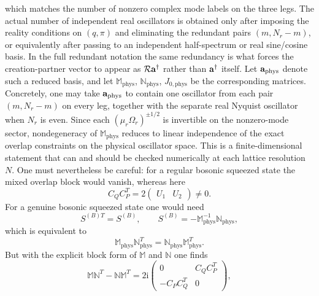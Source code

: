 \documentclass[11pt]{article}
\numberwithin{equation}{section}
\newcommand{\ii}{\mathrm{i}}
\begin{document}
which matches the number of nonzero complex mode labels on the three legs. The actual number of independent real oscillators is obtained only after imposing the reality conditions on $(q,\pi)$ and eliminating the redundant pairs $(m,N_r-m)$, or equivalently after passing to an independent half-spectrum or real sine/cosine basis. In the full redundant notation the same redundancy is what forces the creation-partner vector to appear as $\mathcal R{\bf a}^\dagger$ rather than ${\bf a}^\dagger$ itself. Let ${\bf a}_{\mathrm{phys}}$ denote such a reduced basis, and let $\mathbb M_{\mathrm{phys}}$, $\mathbb N_{\mathrm{phys}}$, $J_{0,\mathrm{phys}}$ be the corresponding matrices. Concretely, one may take ${\bf a}_{\mathrm{phys}}$ to contain one oscillator from each pair $(m,N_r-m)$ on every leg, together with the separate real Nyquist oscillator when $N_r$ is even. Since each $(\mu_r\Omega_r)^{\pm1/2}$ is invertible on the nonzero-mode sector, nondegeneracy of $\mathbb M_{\mathrm{phys}}$ reduces to linear independence of the exact overlap constraints on the physical oscillator space. This is a finite-dimensional statement that can and should be checked numerically at each lattice resolution $N$. One must nevertheless be careful: for a regular bosonic squeezed state the mixed overlap block would vanish, whereas here
\begin{equation}
C_Q C_P^T
=
2\begin{pmatrix}U_1 & U_2\end{pmatrix}\neq 0.
\label{eq:bosonic-symplectic-obstruction}
\end{equation}
For a genuine bosonic squeezed state one would need
\begin{equation}
\label{eq:s11-014}
S^{(B)T}=S^{(B)},
\qquad
S^{(B)}=-\mathbb M_{\mathrm{phys}}^{-1}\mathbb N_{\mathrm{phys}},
\end{equation}
which is equivalent to
\begin{equation}
\label{eq:s11-015}
\mathbb M_{\mathrm{phys}}\mathbb N_{\mathrm{phys}}^T
=
\mathbb N_{\mathrm{phys}}\mathbb M_{\mathrm{phys}}^T.
\end{equation}
But with the explicit block form of $\mathbb M$ and $\mathbb N$ one finds
\begin{equation}
\label{eq:s11-016}
\mathbb M\mathbb N^T-\mathbb N\mathbb M^T
=
2\ii
\begin{pmatrix}
0 & C_QC_P^T\\
-C_PC_Q^T & 0
\end{pmatrix},
\end{equation}
\end{document}
